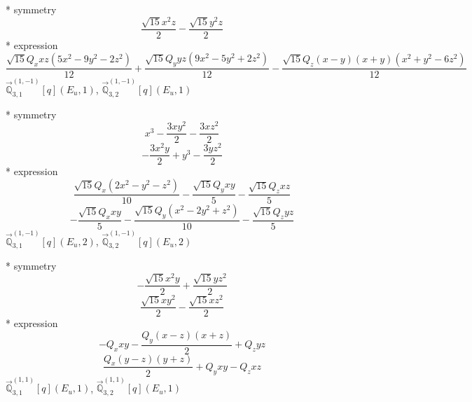 \documentclass[fleqn,8pt]{jsarticle}
\begin{document}
\noindent\quad ** symmetry
\begin{dmath*}
\frac{\sqrt{15} x^{2} z}{2} - \frac{\sqrt{15} y^{2} z}{2}
\end{dmath*}
\noindent\quad ** expression
\begin{dmath*}
\frac{\sqrt{15} Q_{x} x z \left(5 x^{2} - 9 y^{2} - 2 z^{2}\right)}{12} + \frac{\sqrt{15} Q_{y} y z \left(9 x^{2} - 5 y^{2} + 2 z^{2}\right)}{12} - \frac{\sqrt{15} Q_{z} \left(x - y\right) \left(x + y\right) \left(x^{2} + y^{2} - 6 z^{2}\right)}{12}
\end{dmath*}
\noindent\quad $\vec{\mathbb{Q}}_{3,1}^{(1,-1)}[q](E_{u},1)$, $\vec{\mathbb{Q}}_{3,2}^{(1,-1)}[q](E_{u},1)$

\noindent\quad ** symmetry
\begin{dmath*}
x^{3} - \frac{3 x y^{2}}{2} - \frac{3 x z^{2}}{2}
\end{dmath*}
\begin{dmath*}
- \frac{3 x^{2} y}{2} + y^{3} - \frac{3 y z^{2}}{2}
\end{dmath*}
\noindent\quad ** expression
\begin{dmath*}
\frac{\sqrt{15} Q_{x} \left(2 x^{2} - y^{2} - z^{2}\right)}{10} - \frac{\sqrt{15} Q_{y} x y}{5} - \frac{\sqrt{15} Q_{z} x z}{5}
\end{dmath*}
\begin{dmath*}
- \frac{\sqrt{15} Q_{x} x y}{5} - \frac{\sqrt{15} Q_{y} \left(x^{2} - 2 y^{2} + z^{2}\right)}{10} - \frac{\sqrt{15} Q_{z} y z}{5}
\end{dmath*}
\noindent\quad $\vec{\mathbb{Q}}_{3,1}^{(1,-1)}[q](E_{u},2)$, $\vec{\mathbb{Q}}_{3,2}^{(1,-1)}[q](E_{u},2)$

\noindent\quad ** symmetry
\begin{dmath*}
- \frac{\sqrt{15} x^{2} y}{2} + \frac{\sqrt{15} y z^{2}}{2}
\end{dmath*}
\begin{dmath*}
\frac{\sqrt{15} x y^{2}}{2} - \frac{\sqrt{15} x z^{2}}{2}
\end{dmath*}
\noindent\quad ** expression
\begin{dmath*}
- Q_{x} x y - \frac{Q_{y} \left(x - z\right) \left(x + z\right)}{2} + Q_{z} y z
\end{dmath*}
\begin{dmath*}
\frac{Q_{x} \left(y - z\right) \left(y + z\right)}{2} + Q_{y} x y - Q_{z} x z
\end{dmath*}
\noindent\quad $\vec{\mathbb{Q}}_{3,1}^{(1,1)}[q](E_{u},1)$, $\vec{\mathbb{Q}}_{3,2}^{(1,1)}[q](E_{u},1)$
\end{document}
